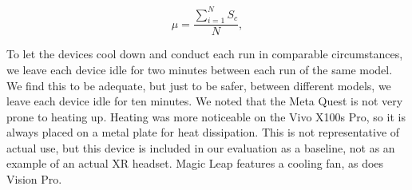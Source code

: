 \begin{equation}
\label{eq:time_efficiency}
\mu = \frac{\sum_{i=1}^{N} S_c}{N},
\end{equation}


To let the devices cool down and conduct each run in comparable circumstances, we leave each device idle for two minutes between each run of the same model. We find this to be adequate, but just to be safer, between different models, we leave each device idle for ten minutes. We noted that the Meta Quest is not very prone to heating up. Heating was more noticeable on the Vivo X100s Pro, so it is always placed on a metal plate for heat dissipation. This is not representative of actual use, but this device is included in our evaluation as a baseline, not as an example of an actual XR headset. Magic Leap features a cooling fan, as does Vision Pro.\\







